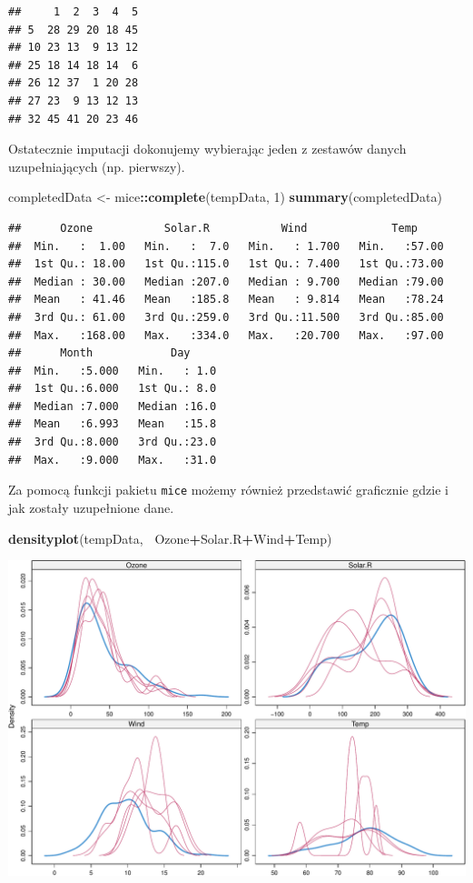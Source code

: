 \documentclass[
]{book}
\newenvironment{Shaded}{\begin{snugshade}}{\end{snugshade}}
\newcommand{\DecValTok}[1]{\textcolor[rgb]{0.00,0.00,0.81}{#1}}
\newcommand{\KeywordTok}[1]{\textcolor[rgb]{0.13,0.29,0.53}{\textbf{#1}}}
\newcommand{\NormalTok}[1]{#1}
\newcommand{\OperatorTok}[1]{\textcolor[rgb]{0.81,0.36,0.00}{\textbf{#1}}}
\newcommand{\StringTok}[1]{\textcolor[rgb]{0.31,0.60,0.02}{#1}}
\theoremstyle{plain}
\theoremstyle{definition}
\theoremstyle{definition}
\theoremstyle{definition}
\theoremstyle{definition}
\theoremstyle{remark}
\begin{document}
\begin{verbatim}
##     1  2  3  4  5
## 5  28 29 20 18 45
## 10 23 13  9 13 12
## 25 18 14 18 14  6
## 26 12 37  1 20 28
## 27 23  9 13 12 13
## 32 45 41 20 23 46
\end{verbatim}

Ostatecznie imputacji dokonujemy wybierając jeden z zestawów danych uzupełniających (np. pierwszy).

\begin{Shaded}
\begin{Highlighting}[]
\NormalTok{completedData <-}\StringTok{ }\NormalTok{mice}\OperatorTok{::}\KeywordTok{complete}\NormalTok{(tempData, }\DecValTok{1}\NormalTok{)}
\KeywordTok{summary}\NormalTok{(completedData)}
\end{Highlighting}
\end{Shaded}

\begin{verbatim}
##      Ozone           Solar.R           Wind             Temp      
##  Min.   :  1.00   Min.   :  7.0   Min.   : 1.700   Min.   :57.00  
##  1st Qu.: 18.00   1st Qu.:115.0   1st Qu.: 7.400   1st Qu.:73.00  
##  Median : 30.00   Median :207.0   Median : 9.700   Median :79.00  
##  Mean   : 41.46   Mean   :185.8   Mean   : 9.814   Mean   :78.24  
##  3rd Qu.: 61.00   3rd Qu.:259.0   3rd Qu.:11.500   3rd Qu.:85.00  
##  Max.   :168.00   Max.   :334.0   Max.   :20.700   Max.   :97.00  
##      Month            Day      
##  Min.   :5.000   Min.   : 1.0  
##  1st Qu.:6.000   1st Qu.: 8.0  
##  Median :7.000   Median :16.0  
##  Mean   :6.993   Mean   :15.8  
##  3rd Qu.:8.000   3rd Qu.:23.0  
##  Max.   :9.000   Max.   :31.0
\end{verbatim}

Za pomocą funkcji pakietu \texttt{mice} możemy również przedstawić graficznie gdzie i jak zostały uzupełnione dane.

\begin{Shaded}
\begin{Highlighting}[]
\KeywordTok{densityplot}\NormalTok{(tempData, }\OperatorTok{~}\NormalTok{Ozone}\OperatorTok{+}\NormalTok{Solar.R}\OperatorTok{+}\NormalTok{Wind}\OperatorTok{+}\NormalTok{Temp)}
\end{Highlighting}
\end{Shaded}

\includegraphics{EksploracjaDanych_files/figure-latex/unnamed-chunk-9-1.pdf}
\end{document}
